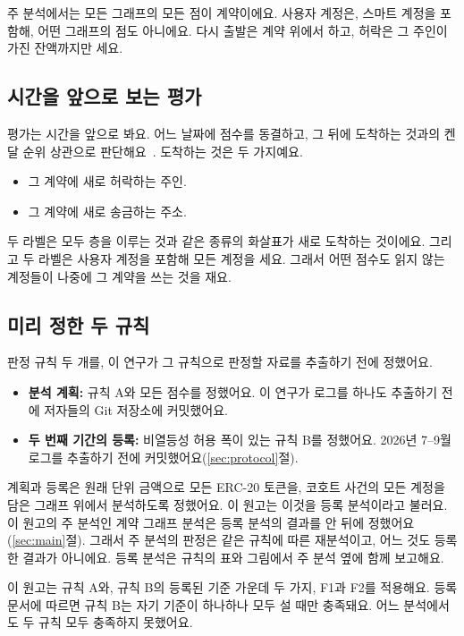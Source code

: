 주 분석에서는 모든 그래프의 모든 점이 계약이에요. 사용자 계정은, 스마트 계정을 포함해, 어떤 그래프의 점도 아니에요. 다시 출발은 계약 위에서 하고, 허락은 그 주인이 가진 잔액까지만 세요.

\subsection{시간을 앞으로 보는 평가}

평가는 시간을 앞으로 봐요. 어느 날짜에 점수를 동결하고, 그 뒤에 도착하는 것과의 켄달 순위 상관으로 판단해요~\cite{kendall1938rank}. 도착하는 것은 두 가지예요.
\begin{itemize}
\item 그 계약에 새로 허락하는 주인.
\item 그 계약에 새로 송금하는 주소.
\end{itemize}
두 라벨은 모두 층을 이루는 것과 같은 종류의 화살표가 새로 도착하는 것이에요. 그리고 두 라벨은 사용자 계정을 포함해 모든 계정을 세요. 그래서 어떤 점수도 읽지 않는 계정들이 나중에 그 계약을 쓰는 것을 재요.

\subsection{미리 정한 두 규칙}

판정 규칙 두 개를, 이 연구가 그 규칙으로 판정할 자료를 추출하기 전에 정했어요.
\begin{itemize}
\item \textbf{분석 계획:} 규칙 A와 모든 점수를 정했어요. 이 연구가 로그를 하나도 추출하기 전에 저자들의 Git 저장소에 커밋했어요.
\item \textbf{두 번째 기간의 등록:} 비열등성 허용 폭이 있는 규칙 B를 정했어요. 2026년 7–9월 로그를 추출하기 전에 커밋했어요(\ref{sec:protocol}절).
\end{itemize}

계획과 등록은 원래 단위 금액으로 모든 ERC-20 토큰을, 코호트 사건의 모든 계정을 담은 그래프 위에서 분석하도록 정했어요. 이 원고는 이것을 등록 분석이라고 불러요. 이 원고의 주 분석인 계약 그래프 분석은 등록 분석의 결과를 안 뒤에 정했어요(\ref{sec:main}절). 그래서 주 분석의 판정은 같은 규칙에 따른 재분석이고, 어느 것도 등록한 결과가 아니에요. 등록 분석은 규칙의 표와 그림에서 주 분석 옆에 함께 보고해요.

이 원고는 규칙 A와, 규칙 B의 등록된 기준 가운데 두 가지, F1과 F2를 적용해요. 등록 문서에 따르면 규칙 B는 자기 기준이 하나하나 모두 설 때만 충족돼요. 어느 분석에서도 두 규칙 모두 충족하지 못했어요.

